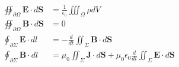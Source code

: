 \documentclass[pdftex,11pt,a4paper]{memoir}
\begin{document}
\vspace*{0.1in}
\hspace{0.in}\begin{minipage}{3in}
\tiny
\begin{align*}
\oiint_{\partial\Omega}\mathbf{E}\cdot d\mathbf{S} &= \frac{1}{\epsilon_0}\iiint_\Omega \rho dV\\
\oiint_{\partial\Omega}\mathbf{B}\cdot d\mathbf{S} &= 0\\
\oint_{\partial\Sigma}\mathbf{E}\cdot dl &= -\frac{d}{dt}\iint_{\Sigma}\mathbf{B}\cdot d\mathbf{S}\\
\oint_{\partial\Sigma}\mathbf{B}\cdot dl &= \mu_0 \iint_{\Sigma}\mathbf{J} \cdot d\mathbf{S} + \mu_0\epsilon_0\frac{d}{dt}\iint_{\Sigma}\mathbf{E}\cdot d\mathbf{S}
\end{align*}
\end{minipage}
\end{document}
